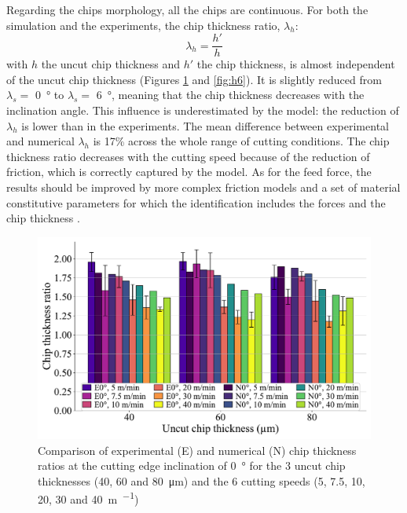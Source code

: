 \documentclass[preprint,12pt,times]{elsarticle}
\begin{document}
Regarding the chips morphology, all the chips are continuous. For both the simulation and the experiments, the chip thickness ratio, $\lambda_h$:
%
\begin{equation}
\lambda_h = \frac{h'}{h}
\end{equation}
%
with $h$ the uncut chip thickness and $h'$ the chip thickness, is almost independent of the uncut chip thickness (Figures \ref{fig:h0} and \ref{fig:h6}). It is slightly reduced from $\lambda_s =$ \qty{0}{\degree} to $\lambda_s =$ \qty{6}{\degree}, meaning that the chip thickness decreases with the inclination angle. This influence is underestimated by the model: the reduction of $\lambda_h$ is lower than in the experiments. The mean difference between experimental and numerical $\lambda_h$ is 17\% across the whole range of cutting conditions. The chip thickness ratio decreases with the cutting speed because of the reduction of friction, which is correctly captured by the model. As for the feed force, the results should be improved by more complex friction models and a set of material constitutive parameters for which the identification includes the forces and the chip thickness \cite{kugalurpalanisamy_Identification_2022}.

\begin{figure}[!h]
\centering
\includegraphics[width = 140 mm]{Figures/h0}
\caption{Comparison of experimental (E) and numerical (N) chip thickness ratios at the cutting edge inclination of \qty{0}{\degree} for the 3 uncut chip thicknesses (40, 60 and \qty{80}{\um}) and the 6 cutting speeds (5, 7.5, 10, 20, 30 and \qty{40}{\m\per\min})}
\label{fig:h0}
\end{figure}
\end{document}
